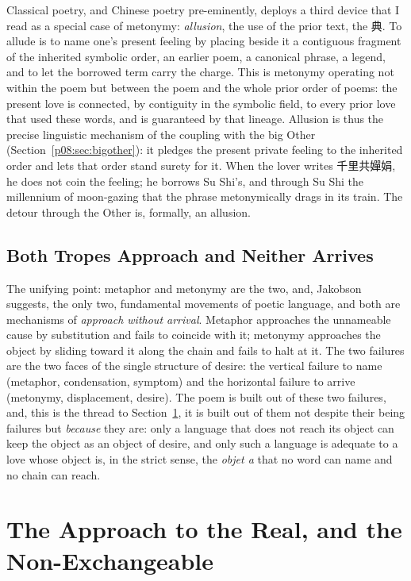Classical poetry, and Chinese poetry pre-eminently, deploys a third device that I read as a special case of metonymy: \emph{allusion}, the use of the prior text, the \cjkfont 典\normalfont. To allude is to name one's present feeling by placing beside it a contiguous fragment of the inherited symbolic order, an earlier poem, a canonical phrase, a legend, and to let the borrowed term carry the charge. This is metonymy operating not within the poem but between the poem and the whole prior order of poems: the present love is connected, by contiguity in the symbolic field, to every prior love that used these words, and is guaranteed by that lineage. Allusion is thus the precise linguistic mechanism of the coupling with the big Other (Section~\ref{p08:sec:bigother}): it pledges the present private feeling to the inherited order and lets that order stand surety for it. When the lover writes \cjkfont 千里共嬋娟\normalfont, he does not coin the feeling; he borrows Su Shi's, and through Su Shi the millennium of moon-gazing that the phrase metonymically drags in its train. The detour through the Other is, formally, an allusion.

\subsection{Both Tropes Approach and Neither Arrives}

The unifying point: metaphor and metonymy are the two, and, Jakobson suggests, the only two, fundamental movements of poetic language, and both are mechanisms of \emph{approach without arrival}. Metaphor approaches the unnameable cause by substitution and fails to coincide with it; metonymy approaches the object by sliding toward it along the chain and fails to halt at it. The two failures are the two faces of the single structure of desire: the vertical failure to name (metaphor, condensation, symptom) and the horizontal failure to arrive (metonymy, displacement, desire). The poem is built out of these two failures, and, this is the thread to Section~\ref{p08:sec:real}, it is built out of them not despite their being failures but \emph{because} they are: only a language that does not reach its object can keep the object as an object of desire, and only such a language is adequate to a love whose object is, in the strict sense, the \textit{objet a} that no word can name and no chain can reach.

\section{The Approach to the Real, and the Non-Exchangeable}\label{p08:sec:real}

